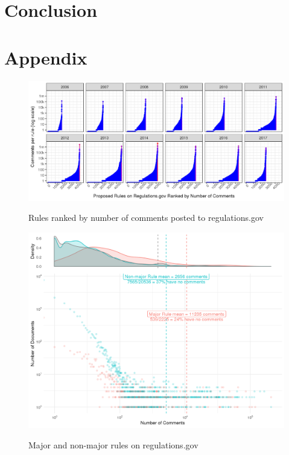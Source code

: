 \documentclass{article}
\begin{document}


\section{Conclusion}


\newpage
\section{Appendix}

\begin{figure}[h!]
    \centering
        \caption{Rules ranked by number of comments posted to regulations.gov}
    \includegraphics[width = 6.5in]{Figs/rules-ranked-comments-per-year-1.png}
    \label{fig:rules-ranked}
\end{figure}

\begin{figure}[p!]
    \centering
        \caption{Major and non-major rules on regulations.gov}
    \includegraphics[width = 7in]{Figs/major-comments-density-1.png}
    \label{fig:rules-major}
\end{figure}
\end{document}

